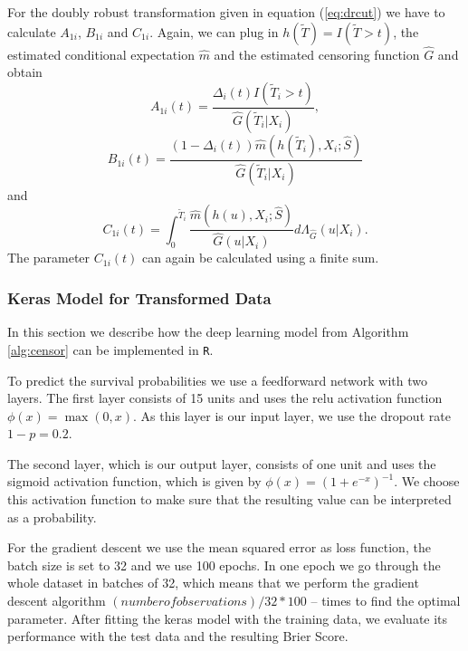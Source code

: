\documentclass[12pt, a4paper]{scrartcl}
\theoremstyle{definition}
\theoremstyle{plain}
\numberwithin{equation}{section}
\numberwithin{figure}{section}
\numberwithin{table}{section}
\begin{document}
	For the doubly robust transformation given in equation (\ref{eq:drcut}) we have to calculate $A_{1i}$, $B_{1i}$ and $C_{1i}$.
	Again, we can plug in $h(\tilde T)=I(\tilde T>t)$, the estimated conditional expectation $\hat{m}$ and the estimated censoring function $\hat{G}$ and obtain
	\begin{equation*}
		A_{1i}(t)=\frac{\Delta_i(t)I(\tilde{T}_i >t)}{\hat{G}(\tilde{T}_i\vert X_i)},
	\end{equation*}
	\begin{equation*}
		B_{1i}(t) = \frac{(1-\Delta_i(t))\hat{m}(h(\tilde{T}_i), X_i; \hat{S})}{\hat{G}(\tilde{T}_i \vert X_i)}
	\end{equation*}
	and
	\begin{equation*}
	C_{1i}(t) = \int_{0}^{\tilde T_i}\frac{\hat{m}(h(u), X_i; \hat{S})}{\hat{G}(u\vert X_i)}d\Lambda_{\hat{G}}(u \vert X_i).
	\end{equation*}
	The parameter $C_{1i}(t)$ can again be calculated using a finite sum.
	\subsubsection{Keras Model for Transformed Data}\label{keras}
	
	In this section we describe how the deep learning model from Algorithm \ref{alg:censor} can be implemented in \texttt{R}.
	
	To predict the survival probabilities we use a feedforward network with two layers.
	The first layer consists of 15 units and uses the relu activation function $\phi(x) = \max(0, x)$.
	As this layer is our input layer, we use the dropout rate $1-p=0.2$.
	
	The second layer, which is our output layer, consists of one unit and uses the sigmoid activation function, which is given by $\phi(x)=(1+e^{-x})^{-1}$.
	We choose this activation function to make sure that the resulting value can be interpreted as a probability.
	
	For the gradient descent we use the mean squared error as loss function, the batch size is set to 32 and we use 100 epochs.
	In one epoch we go through the whole dataset in batches of 32, which means that we perform the gradient descent algorithm $(number of observations)/32*100$ -- times to find the optimal parameter.
	After fitting the keras model with the training data, we evaluate its performance with the test data and the resulting Brier Score.
	
\end{document}

